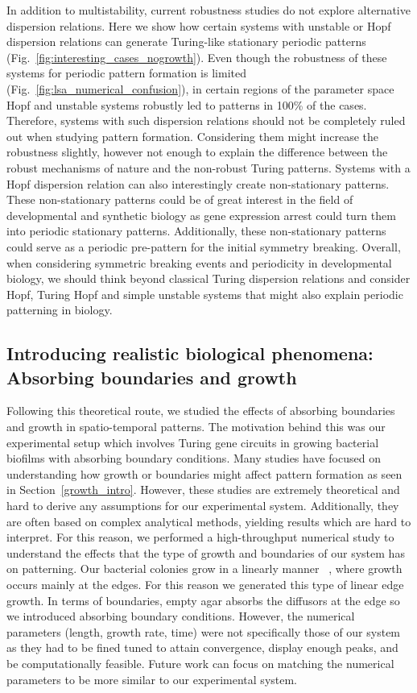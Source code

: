 In addition to multistability, current robustness studies do not explore alternative dispersion relations.
Here we show how certain systems with unstable or Hopf dispersion relations can generate Turing-like stationary periodic patterns (Fig.~\ref{fig:interesting_cases_nogrowth}).
Even though the robustness of these systems for periodic pattern formation is limited (Fig.~\ref{fig:lsa_numerical_confusion}), in certain regions of the parameter space Hopf and unstable systems robustly led to patterns in 100\% of the cases.
Therefore, systems with such dispersion relations should not be completely ruled out when studying pattern formation.
Considering them might increase the robustness slightly, however not enough to explain the difference between the robust mechanisms of nature and the non-robust Turing patterns.
Systems with a Hopf dispersion relation can also interestingly create non-stationary patterns.
These non-stationary patterns could be of great interest in the field of developmental and synthetic biology as gene expression arrest could turn them into periodic stationary patterns.
Additionally, these non-stationary patterns could serve as a periodic pre-pattern for the initial symmetry breaking.
Overall, when considering symmetric breaking events and periodicity in developmental biology, we should think beyond classical Turing dispersion relations and consider Hopf, Turing Hopf and simple unstable systems that might also explain periodic patterning in biology.

\subsection*{Introducing realistic biological phenomena: Absorbing boundaries and growth}
Following this theoretical route, we studied the effects of absorbing boundaries and growth in spatio-temporal patterns.
The motivation behind this was our experimental setup which involves Turing gene circuits in growing bacterial biofilms with absorbing boundary conditions.
Many studies have focused on understanding how growth or boundaries might affect pattern formation as seen in Section~\ref{growth_intro}.
However, these studies are extremely theoretical and hard to derive any assumptions for our experimental system.
Additionally, they are often based on complex analytical methods, yielding results which are hard to interpret.
For this reason, we performed a high-throughput numerical study to understand the effects that the type of growth and boundaries of our system has on patterning.
Our bacterial colonies grow in a linearly manner ~\cite{Tica2023}, where growth occurs mainly at the edges.
For this reason we generated this type of linear edge growth.
In terms of boundaries, empty agar absorbs the diffusors at the edge so we introduced absorbing boundary conditions.
However, the numerical parameters (length, growth rate, time) were not specifically those of our system as they had to be fined tuned to attain convergence, display enough peaks, and be computationally feasible.
Future work can focus on matching the numerical parameters to be more similar to our experimental system.

